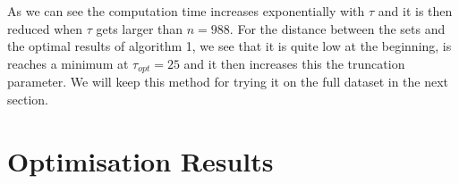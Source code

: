 As we can see the computation time increases exponentially with $\tau$ and it is then reduced when $\tau$ gets larger than $n=988$.  For the distance between the sets and the optimal results of algorithm 1, we see that it is quite low at the beginning, is reaches a minimum at $\tau_{opt} = 25$ and it then increases this the truncation parameter. We will keep this method for trying it on the full dataset in the next section. 

%
%

%
%
%
%











\section{Optimisation Results}

